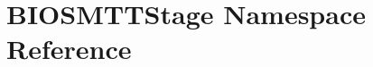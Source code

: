 \hypertarget{namespaceBIOSMTTStage}{\section{B\-I\-O\-S\-M\-T\-T\-Stage Namespace Reference}
\label{namespaceBIOSMTTStage}
}
